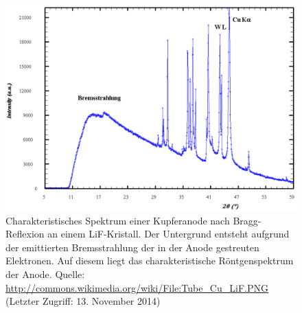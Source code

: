 \documentclass[11pt, a4paper]{article}
\numberwithin{equation}{section}
\begin{document}
\begin{figure}[ht]
	\centering
	\includegraphics[width=1\textwidth]{./figures/Tube_Cu_LiF.pdf}
	\caption{Charakteristisches Spektrum einer Kupferanode nach Bragg-Reflexion an einem LiF-Kristall. Der Untergrund entsteht aufgrund der emittierten Bremsstrahlung der in der Anode gestreuten Elektronen. Auf diesem liegt das charakteristische Röntgenspektrum der Anode. Quelle: \url{http://commons.wikimedia.org/wiki/File:Tube_Cu_LiF.PNG} (Letzter Zugriff: 13. November 2014)}
	\label{fig:spektrum}
\end{figure}
\end{document}
